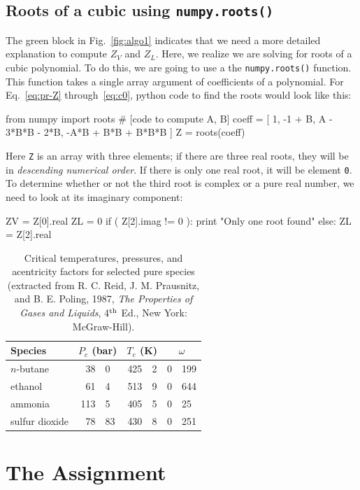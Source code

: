 \documentclass[11pt]{article}
\begin{document}
\subsection*{Roots of a cubic using {\tt numpy.roots()}}
The green block in Fig.~\ref{fig:algo1} indicates that we need a more detailed explanation to compute $Z_V$ and $Z_L$.  Here, we realize we are solving for roots of a cubic polynomial.  To do this, we are going to use a the {\tt numpy.roots()} function.  This function takes a single array argument of coefficients of a polynomial.  For Eq.~\ref{eq:pr-Z} through~\ref{eq:c0}, python code to find the roots would look like this:
\begin{python}
from numpy import roots
# [code to compute A, B]
coeff = [ 1, -1 + B, A - 3*B*B - 2*B, -A*B + B*B + B*B*B ]
Z = roots(coeff)
\end{python}
Here {\tt Z} is an array with three elements; if there are three real roots, they will be in {\em descending numerical order}.  If there is only one real root, it will be element {\tt 0}.  To determine whether or not the third root is complex or a pure real number, we need to look at its imaginary component:
\begin{python}
ZV = Z[0].real
ZL = 0
if ( Z[2].imag != 0 ):
   print "Only one root found"
else:
   ZL = Z[2].real
\end{python}

\begin{table}
\begin{center}
\caption{\label{tbl:data} Critical temperatures, pressures, and acentricity factors for selected pure species (extracted from R. C. Reid, J. M. Prausnitz, and B. E. Poling, 1987, {\it The Properties of Gases and Liquids}, 4$^{\rm th}$ Ed., New York: McGraw-Hill).}
\begin{tabular}{lr@{.}lr@{.}lr@{.}l}
Species & \multicolumn{2}{c}{$P_c$ (bar)} &\multicolumn{2}{c}{$T_c$ (K)} & \multicolumn{2}{c}{$\omega$}\\\hline
$n$-butane &  38&0 & 425&2 & 0&199\\ 
ethanol &  61&4 & 513&9 & 0&644\\
ammonia &  113&5 & 405&5 & 0&25\\
sulfur dioxide & 78&83 & 430&8 & 0&251\\
\end{tabular}
\end{center}
\end{table}

\clearpage

\section*{The Assignment}
\end{document}
